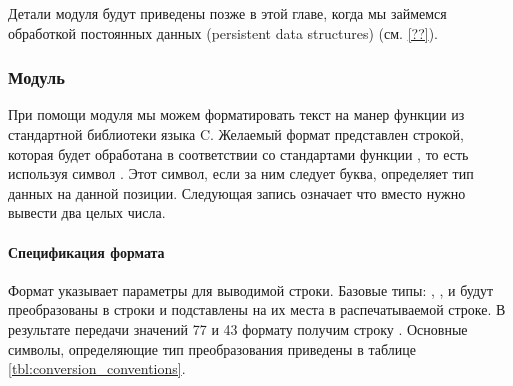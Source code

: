 Детали модуля  будут приведены позже в этой главе, когда мы 
займемся обработкой постоянных данных (persistent data structures) (см. 
\ref{??}).

\subsubsection{Модуль }
\label{subsubsec:module_printf}

При помощи модуля  мы можем форматировать текст на манер функции 
 из стандартной библиотеки языка C. Желаемый формат представлен 
строкой, которая будет обработана в соответствии со стандартами функции 
, то есть используя символ \code{\%}. Этот символ, если за ним 
следует буква, определяет тип данных на данной позиции. Следующая запись 
 означает что вместо  нужно вывести два целых 
числа.

\paragraph{Спецификация формата}

Формат указывает параметры для выводимой строки. Базовые типы: ,
,  и  будут преобразованы в строки и 
подставлены на их места в распечатываемой строке. В результате передачи значений 
77 и 43 формату  получим строку . 
Основные символы, определяющие тип преобразования приведены в таблице 
\ref{tbl:conversion_conventions}.

